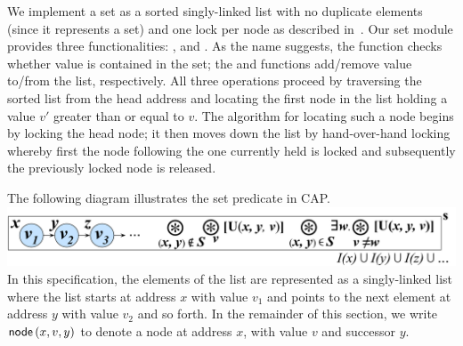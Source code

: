 We implement a set as a sorted singly-linked list with no duplicate elements (since it represents a set) and one lock per node as described in~\cite{cap-ecoop10}. Our set module provides three functionalities: ,  and .
As the name suggests, the  function checks whether value  is contained in the set; the  and  functions add/remove value  to/from the list, respectively.
%
All three operations proceed by traversing the sorted list from the head address and locating the first node in the list holding a value $v'$ greater than or equal to $v$. The algorithm for locating such a node begins by locking the head node; it then moves down the list by hand-over-hand locking whereby first the node following the one currently held is locked and subsequently the previously locked node is released. 
%

The following diagram illustrates the set predicate in CAP.\\
%
\includegraphics[scale=0.232]{Sections/FurtherExamples/Images/capSet.pdf}\\
%
%
%
In this specification, the elements of the list are represented as a singly-linked list where the list starts at address $x$ with value $v_1$ and points to the next element at address $y$ with value $v_2$ and so forth. In the remainder of this section, we write $\textsf{node}\left(x, v, y\right)$ to denote a node at address $x$, with value $v$ and successor $y$. 

